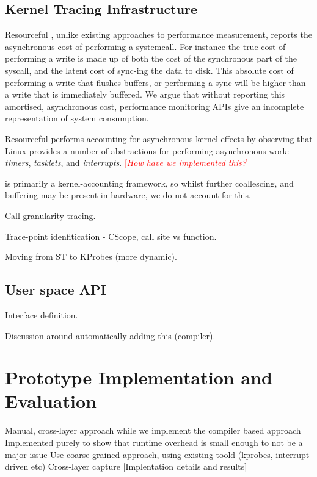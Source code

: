 \documentclass[letterpaper,twocolumn,10pt]{article}
\newcommand{\pname}{Resourceful}
\newcommand{\lnote}[1]{\textcolor{red}{[\textit{#1}]}} %
\begin{document}


\subsection{Kernel Tracing Infrastructure}

\pname{ }, unlike existing approaches to performance measurement, reports the asynchronous cost of performing a systemcall.
For instance the true cost of performing a write is made up of both the cost of the synchronous part of the syscall, and the latent cost of sync-ing the data to disk.
This absolute cost of performing a write that flushes buffers, or performing a sync will be higher than a write that is immediately buffered.
We argue that without reporting this amortised, asynchronous cost, performance monitoring APIs give an incomplete representation of system consumption.

\pname{ } performs accounting for asynchronous kernel effects by observing that Linux provides a number of abstractions for performing asynchronous work: \emph{timers}, \emph{tasklets}, and \emph{interrupts}.
\lnote{How have we implemented this?}

\panme{ } is primarily a kernel-accounting framework, so whilst further coallescing, and buffering may be present in hardware, we do not account for this.


Call granularity tracing.

Trace-point idenfitication - CScope, call site vs function.

Moving from ST to KProbes (more dynamic).

\subsection{User space API}
Interface definition.

Discussion around automatically adding this (compiler).	

\section{Prototype Implementation and Evaluation}
Manual, cross-layer approach while we implement the compiler based approach
Implemented purely to show that runtime overhead is small enough to not be a major issue
Use coarse-grained approach, using existing toold (kprobes, interrupt driven etc)
Cross-layer capture
[Implentation details and results]
\end{document}
